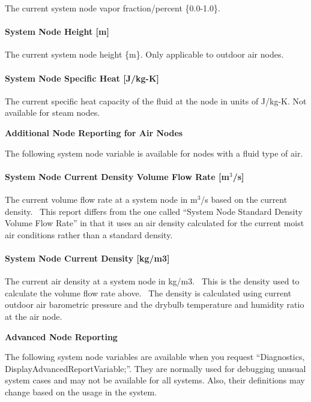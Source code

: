 The current system node vapor fraction/percent \{0.0-1.0\}.

\paragraph{System Node Height {[}m{]}}\label{system-node-height-m}

The current system node height \{m\}. Only applicable to outdoor air nodes.

\paragraph{System Node Specific Heat {[}J/kg-K{]}}\label{system-node-specific-heat-jkg-k}

The current specific heat capacity of the fluid at the node in units of J/kg-K. Not available for steam nodes.

\textbf{Additional Node Reporting for Air Nodes}

The following system node variable is available for nodes with a fluid type of air.

\paragraph{System Node Current Density Volume Flow Rate {[}m\(^{3}\)/s{]}}\label{system-node-current-density-volume-flow-rate-m3s}

The current volume flow rate at a system node in m\(^{3}\)/s based on the current density.~ This report differs from the one called ``System Node Standard Density Volume Flow Rate'' in that it uses an air density calculated for the current moist air conditions rather than a standard density.

\paragraph{System Node Current Density {[}kg/m3{]}}\label{system-node-current-density-kgm3}

The current air density at a system node in kg/m3.~ This is the density used to calculate the volume flow rate above.~ The density is calculated using current outdoor air barometric pressure and the drybulb temperature and humidity ratio at the air node.

\textbf{Advanced Node Reporting}

The following system node variables are available when you request ``Diagnostics, DisplayAdvancedReportVariable;''. They are normally used for debugging unusual system cases and may not be available for all systems. Also, their definitions may change based on the usage in the system.

